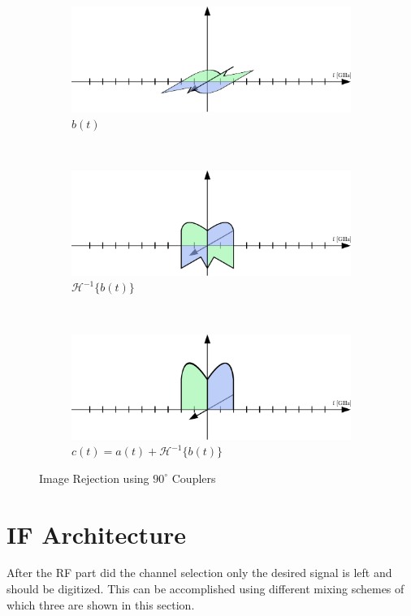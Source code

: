 \begin{figure}[p]
\begin{subfigure}{0.45\textwidth}
    \includegraphics[width=\textwidth]{figures/rx_rf_1_freq_b}
    \caption{$b(t)$}
    \label{fig:rx_rf_1_freq_b}
  \end{subfigure}
  \vspace{4ex} \\
  \begin{subfigure}{0.45\textwidth}
    \centering
    \includegraphics[width=\textwidth]{figures/rx_rf_1_freq_Hb}
    \caption{$\mathcal{H}^{-1}\{b(t)\}$}
    \label{fig:rx_rf_1_freq_Hb}
  \end{subfigure}
  ~
  \begin{subfigure}{0.45\textwidth}
    \centering
    \includegraphics[width=\textwidth]{figures/rx_rf_1_freq_c}
    \caption{$c(t) = a(t) + \mathcal{H}^{-1}\{b(t)\}$}
    \label{fig:rx_rf_1_freq_c}
  \end{subfigure}
  \caption{Image Rejection using $90^\circ$ Couplers}
  \label{fig:rx_rf_1_freq}
\end{figure}

\section{IF Architecture}
After the \gls{RF} part did the channel selection only the desired signal
is left and should be digitized.
This can be accomplished using different
mixing schemes of which three are shown in this section. \\

